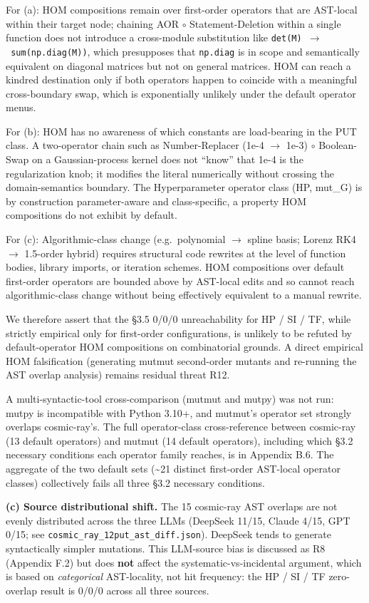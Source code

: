 \documentclass[acmsmall,screen,review]{acmart}
\begin{document}
For (a): HOM compositions remain over first-order operators that are
AST-local within their target node; chaining AOR $\circ$ Statement-Deletion
within a single function does not introduce a cross-module substitution
like \texttt{det(M)\ $\to$\ sum(np.diag(M))}, which presupposes that
\texttt{np.diag} is in scope and semantically equivalent on diagonal
matrices but not on general matrices. HOM can reach a kindred
destination only if both operators happen to coincide with a meaningful
cross-boundary swap, which is exponentially unlikely under the default
operator menus.

For (b): HOM has no awareness of which constants are load-bearing in the
PUT class. A two-operator chain such as Number-Replacer (1e-4 $\to$ 1e-3) $\circ$
Boolean-Swap on a Gaussian-process kernel does not ``know'' that 1e-4 is
the regularization knob; it modifies the literal numerically without
crossing the domain-semantics boundary. The Hyperparameter operator
class (HP, mut\_G) is by construction parameter-aware and
class-specific, a property HOM compositions do not exhibit by default.

For (c): Algorithmic-class change (e.g.~polynomial $\to$ spline basis;
Lorenz RK4 $\to$ 1.5-order hybrid) requires structural code rewrites at the
level of function bodies, library imports, or iteration schemes. HOM
compositions over default first-order operators are bounded above by
AST-local edits and so cannot reach algorithmic-class change without
being effectively equivalent to a manual rewrite.

We therefore assert that the §3.5 0/0/0 unreachability for HP / SI / TF,
while strictly empirical only for first-order configurations, is
unlikely to be refuted by default-operator HOM compositions on
combinatorial grounds. A direct empirical HOM falsification (generating
mutmut second-order mutants and re-running the AST overlap analysis)
remains residual threat R12.

A multi-syntactic-tool cross-comparison (mutmut and mutpy) was not run:
mutpy is incompatible with Python 3.10+, and mutmut's operator
set strongly overlaps cosmic-ray's. The full operator-class
cross-reference between cosmic-ray (13 default operators) and mutmut (14
default operators), including which §3.2 necessary conditions each
operator family reaches, is in Appendix B.6. The aggregate of the two
default sets (\textasciitilde21 distinct first-order AST-local operator
classes) collectively fails all three §3.2 necessary conditions.

\textbf{(c) Source distributional shift.} The 15 cosmic-ray AST
overlaps are not evenly distributed across the three LLMs (DeepSeek
11/15, Claude 4/15, GPT 0/15; see
\texttt{cosmic\_ray\_12put\_ast\_diff.json}). DeepSeek tends to generate
syntactically simpler mutations. This LLM-source bias is discussed as R8
(Appendix F.2) but does \textbf{not} affect the systematic-vs-incidental
argument, which is based on \emph{categorical} AST-locality, not hit
frequency: the HP / SI / TF zero-overlap result is 0/0/0 across all
three sources.
\end{document}
